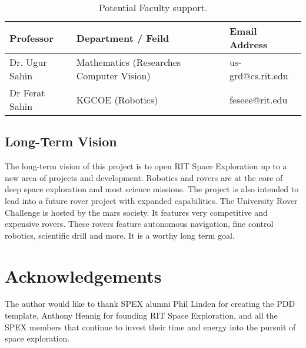 \documentclass[conference]{IEEEtran} %
\begin{document}
\begin{table}[hb!]
    \caption{Potential Faculty support.}
    \centering
    \begin{tabularx}{\linewidth}{|L|L|} 
    \hline
    Professor & Department / Feild & Email Address \\
    \hline
    Dr. Ugur Sahin & Mathematics (Researches Computer Vision) & us-grd@cs.rit.edu \\
    \hline
    Dr Ferat Sahin & KGCOE (Robotics) & feseee@rit.edu \\
    \hline
    \end{tabularx}
\label{tab:fac-sup}
\end{table}

\subsection{Long-Term Vision}
\label{sec:vision}
The long-term vision of this project is to open RIT Space Exploration up to a new area of projects and development. 
Robotics and rovers are at the core of deep space exploration and most science missions. 
The project is also intended to lead into a future rover project with expanded capabilities.
The University Rover Challenge is hosted by the mars society. 
It features very competitive and expensive rovers. 
These rovers feature autonomous navigation, fine control robotics, scientific drill and more. 
It is a worthy long term goal. 


\section*{Acknowledgements}
The author would like to thank SPEX alumni Phil Linden for creating the PDD template, Anthony Hennig for founding RIT Space Exploration, and all the SPEX members that continue to invest their time and energy into the pursuit of space exploration.

\onecolumn
\appendices{}
\end{document}
